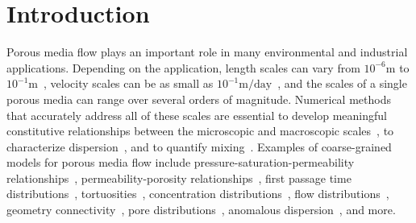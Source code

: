 \documentclass[preprint,10pt]{elsarticle}
\begin{document}
\section{Introduction}
\label{sec:intro}
Porous media flow plays an important role in many environmental and
industrial applications.  Depending on the application, length scales
can vary from $10^{-6}\mathrm{m}$ to
$10^{-1}\mathrm{m}$~\cite{mil-chr-imh-mcb-ped1998}, velocity scales can
be as small as $10^{-1}\mathrm{m/day}$~\cite{kut-scr-dav-ham1995}, and
the scales of a single porous media can range over several orders of
magnitude. Numerical methods that accurately address all of these scales
are essential to develop meaningful constitutive relationships between
the microscopic and macroscopic scales~\cite{mil-chr-imh-mcb-ped1998},
to characterize dispersion~\cite{saf1959}, and to quantify
mixing~\cite{leb-den-dav-bol-car-dec-bou2011, den-leb-eng-bij2011}.
Examples of coarse-grained models for porous media flow include
pressure-saturation-permeability
relationships~\cite{mil-chr-imh-mcb-ped1998}, permeability-porosity
relationships~\cite{dar-mcc1998, car1937, won-kop-tom1984}, first
passage time distributions~\cite{ber-sch-sil2000, hym-den-hag-kan2019,
cve-che-wen1996}, tortuosities~\cite{hak-com-den2019, mat-kha-koz2008,
dud-koz-mat2011, kop-kat-tim1996}, concentration
distributions~\cite{ica-den2019, bel-sal-rin1992}, flow
distributions~\cite{ali-par-wei-bre2017}, geometry
connectivity~\cite{knu-car2005, wes-blo-gra2001}, pore
distributions~\cite{ali-par-wei-bre2017}, anomalous
dispersion~\cite{dea-qua-bir-jua2018, den-cor-sch-ber2004,
sie-ili-pri-riv-gua2019}, and more.  
\end{document}
